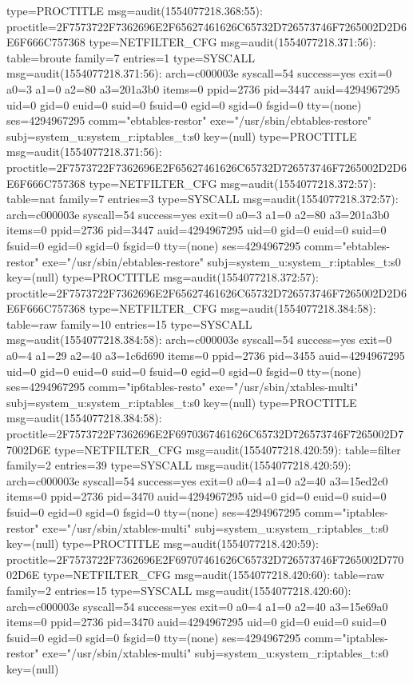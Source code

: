 \documentclass[]{report}
\newenvironment{Shaded}{}{}
\newcommand{\NormalTok}[1]{#1}
\begin{document}
\begin{Shaded}
\begin{Highlighting}[]
\NormalTok{type=PROCTITLE msg=audit(1554077218.368:55): proctitle=2F7573722F7362696E2F65627461626C65732D726573746F7265002D2D6E6F666C757368}
\NormalTok{type=NETFILTER_CFG msg=audit(1554077218.371:56): table=broute family=7 entries=1}
\NormalTok{type=SYSCALL msg=audit(1554077218.371:56): arch=c000003e syscall=54 success=yes exit=0 a0=3 a1=0 a2=80 a3=201a3b0 items=0 ppid=2736 pid=3447 auid=4294967295 uid=0 gid=0 euid=0 suid=0 fsuid=0 egid=0 sgid=0 fsgid=0 tty=(none) ses=4294967295 comm="ebtables-restor" exe="/usr/sbin/ebtables-restore" subj=system_u:system_r:iptables_t:s0 key=(null)}
\NormalTok{type=PROCTITLE msg=audit(1554077218.371:56): proctitle=2F7573722F7362696E2F65627461626C65732D726573746F7265002D2D6E6F666C757368}
\NormalTok{type=NETFILTER_CFG msg=audit(1554077218.372:57): table=nat family=7 entries=3}
\NormalTok{type=SYSCALL msg=audit(1554077218.372:57): arch=c000003e syscall=54 success=yes exit=0 a0=3 a1=0 a2=80 a3=201a3b0 items=0 ppid=2736 pid=3447 auid=4294967295 uid=0 gid=0 euid=0 suid=0 fsuid=0 egid=0 sgid=0 fsgid=0 tty=(none) ses=4294967295 comm="ebtables-restor" exe="/usr/sbin/ebtables-restore" subj=system_u:system_r:iptables_t:s0 key=(null)}
\NormalTok{type=PROCTITLE msg=audit(1554077218.372:57): proctitle=2F7573722F7362696E2F65627461626C65732D726573746F7265002D2D6E6F666C757368}
\NormalTok{type=NETFILTER_CFG msg=audit(1554077218.384:58): table=raw family=10 entries=15}
\NormalTok{type=SYSCALL msg=audit(1554077218.384:58): arch=c000003e syscall=54 success=yes exit=0 a0=4 a1=29 a2=40 a3=1c6d690 items=0 ppid=2736 pid=3455 auid=4294967295 uid=0 gid=0 euid=0 suid=0 fsuid=0 egid=0 sgid=0 fsgid=0 tty=(none) ses=4294967295 comm="ip6tables-resto" exe="/usr/sbin/xtables-multi" subj=system_u:system_r:iptables_t:s0 key=(null)}
\NormalTok{type=PROCTITLE msg=audit(1554077218.384:58): proctitle=2F7573722F7362696E2F6970367461626C65732D726573746F7265002D77002D6E}
\NormalTok{type=NETFILTER_CFG msg=audit(1554077218.420:59): table=filter family=2 entries=39}
\NormalTok{type=SYSCALL msg=audit(1554077218.420:59): arch=c000003e syscall=54 success=yes exit=0 a0=4 a1=0 a2=40 a3=15ed2c0 items=0 ppid=2736 pid=3470 auid=4294967295 uid=0 gid=0 euid=0 suid=0 fsuid=0 egid=0 sgid=0 fsgid=0 tty=(none) ses=4294967295 comm="iptables-restor" exe="/usr/sbin/xtables-multi" subj=system_u:system_r:iptables_t:s0 key=(null)}
\NormalTok{type=PROCTITLE msg=audit(1554077218.420:59): proctitle=2F7573722F7362696E2F69707461626C65732D726573746F7265002D77002D6E}
\NormalTok{type=NETFILTER_CFG msg=audit(1554077218.420:60): table=raw family=2 entries=15}
\NormalTok{type=SYSCALL msg=audit(1554077218.420:60): arch=c000003e syscall=54 success=yes exit=0 a0=4 a1=0 a2=40 a3=15e69a0 items=0 ppid=2736 pid=3470 auid=4294967295 uid=0 gid=0 euid=0 suid=0 fsuid=0 egid=0 sgid=0 fsgid=0 tty=(none) ses=4294967295 comm="iptables-restor" exe="/usr/sbin/xtables-multi" subj=system_u:system_r:iptables_t:s0 key=(null)}

\end{Highlighting}
\end{Shaded}
\end{document}
